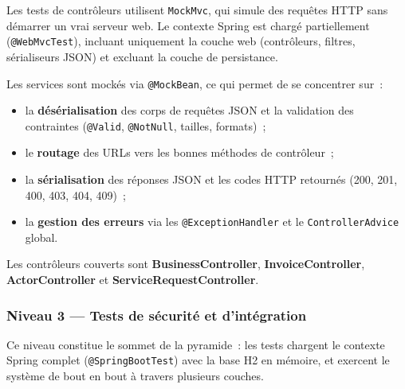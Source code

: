 Les tests de contrôleurs utilisent \texttt{MockMvc}, qui simule des requêtes HTTP sans
démarrer un vrai serveur web. Le contexte Spring est chargé partiellement
(\texttt{@WebMvcTest}), incluant uniquement la couche web (contrôleurs, filtres,
sérialiseurs JSON) et excluant la couche de persistance.

Les services sont mockés via \texttt{@MockBean}, ce qui permet de se concentrer sur~:

\begin{itemize}
  \item la \textbf{désérialisation} des corps de requêtes JSON et la validation des
        contraintes (\texttt{@Valid}, \texttt{@NotNull}, tailles, formats)~;
  \item le \textbf{routage} des URLs vers les bonnes méthodes de contrôleur~;
  \item la \textbf{sérialisation} des réponses JSON et les codes HTTP retournés (200, 201,
        400, 403, 404, 409)~;
  \item la \textbf{gestion des erreurs} via les \texttt{@ExceptionHandler} et le
        \texttt{ControllerAdvice} global.
\end{itemize}

Les contrôleurs couverts sont \textbf{BusinessController}, \textbf{InvoiceController},
\textbf{ActorController} et \textbf{ServiceRequestController}.

\subsubsection*{Niveau 3 — Tests de sécurité et d'intégration}

Ce niveau constitue le sommet de la pyramide~: les tests chargent le contexte Spring
complet (\texttt{@SpringBootTest}) avec la base H2 en mémoire, et exercent le système
de bout en bout à travers plusieurs couches.

